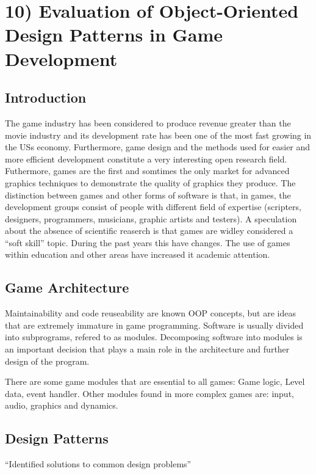 \chapter*{10) Evaluation of Object-Oriented Design Patterns in Game Development}

  \section*{Introduction}
    The game industry has been considered to produce revenue greater than the movie industry and its development rate has been one of the most fast growing in the USs economy. Furthermore, game design and the methods used for easier and more efficient development constitute a very interesting open research field. Futhermore, games are the first and somtimes the only market for advanced graphics techniques to demonstrate the quality of graphics they produce. The distinction between games and other forms of software is that, in games, the development groups consist of people with different field of expertise (scripters, designers, programmers, musicians, graphic artists and testers). A speculation about the absence of scientific reaserch is that games are widley considered a ``soft skill'' topic. During the past years this have changes. The use of games within education and other areas have increased it academic attention. 

  \section*{Game Architecture}

    Maintainability and code reuseability are known OOP concepts, but are ideas that are extremely immature in game programming. Software is usually divided into subprograms, refered to as modules. Decomposing software into modules is an important decision that plays a main role in the architecture and further design of the program. 

    There are some game modules that are essential to all games: Game logic, Level data, event handler. Other modules found in more complex games are: input, audio, graphics and dynamics. 

  \section*{Design Patterns}

    ``Identified solutions to common design problems''

